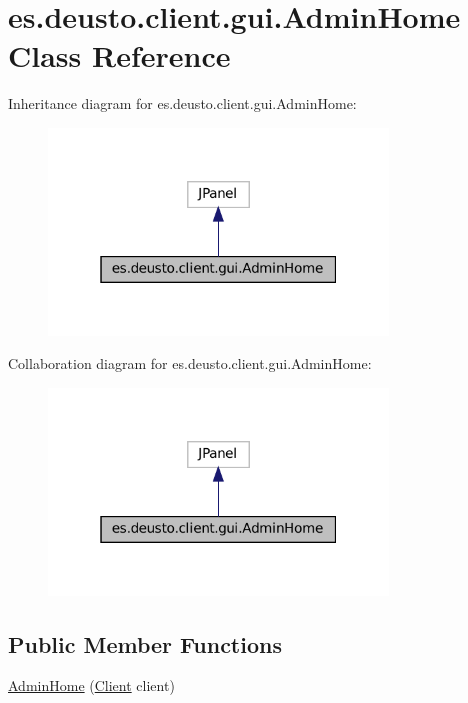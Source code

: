 \hypertarget{classes_1_1deusto_1_1client_1_1gui_1_1_admin_home}{}\section{es.\+deusto.\+client.\+gui.\+Admin\+Home Class Reference}
\label{classes_1_1deusto_1_1client_1_1gui_1_1_admin_home}


Inheritance diagram for es.\+deusto.\+client.\+gui.\+Admin\+Home\+:
\nopagebreak
\begin{figure}[H]
\begin{center}
\leavevmode
\includegraphics[width=256pt]{classes_1_1deusto_1_1client_1_1gui_1_1_admin_home__inherit__graph}
\end{center}
\end{figure}


Collaboration diagram for es.\+deusto.\+client.\+gui.\+Admin\+Home\+:
\nopagebreak
\begin{figure}[H]
\begin{center}
\leavevmode
\includegraphics[width=256pt]{classes_1_1deusto_1_1client_1_1gui_1_1_admin_home__coll__graph}
\end{center}
\end{figure}
\subsection*{Public Member Functions}
\begin{DoxyCompactItemize}
\item 
\mbox{\hyperlink{classes_1_1deusto_1_1client_1_1gui_1_1_admin_home_a5140cdda5a5938ba3f3763ad1fd542ca}{Admin\+Home}} (\mbox{\hyperlink{classes_1_1deusto_1_1client_1_1_client}{Client}} client)
\end{DoxyCompactItemize}


